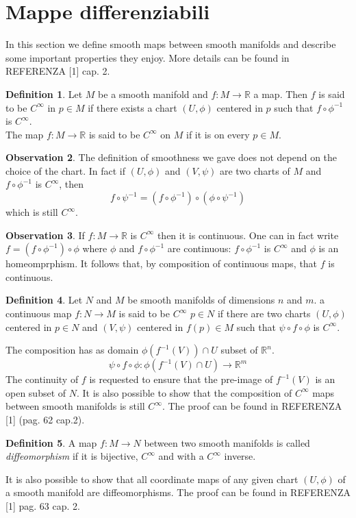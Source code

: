 \documentclass[12pt,a4paper]{report}
\theoremstyle{definition}
\newtheorem{Def}{Definition}[chapter]
\theoremstyle{Theorem}
\theoremstyle{definition}
\theoremstyle{definition}
\newtheorem{Obs}[Def]{Observation}
\begin{document}
		\section{Mappe differenziabili}
		In this section we define smooth maps between smooth manifolds and describe some important properties they enjoy. More details can be found in REFERENZA [1] cap. 2.
		\begin{Def}
			Let $M$ be a smooth manifold and $f:M\rightarrow\mathbb{R}$ a map. Then $f$ is said to be $C^\infty$ in $p\in M$ if there exists a chart $(U,\phi)$ centered in $p$ such that $f\circ \phi^{-1}$ is $C^\infty$.\\
			The map $f:M\rightarrow \mathbb{R}$ is said to be $C^\infty$ on $M$ if it is on every $p\in M$.
		\end{Def}
		\begin{Obs}
			The definition of smoothness we gave does not depend on the choice of the chart. In fact if $(U,\phi)$ and $(V,\psi)$ are two charts of $M$ and $f\circ\phi^{-1}$ is $C^\infty$, then $$f\circ\psi^{-1}=(f\circ\phi^{-1})\circ(\phi\circ\psi^{-1})$$ which is still $C^\infty$.
		\end{Obs}
		\begin{Obs}
			If $f:M\rightarrow \mathbb{R}$ is $C^\infty$ then it is continuous. One can in fact write $f=(f\circ\phi^{-1})\circ \phi$ where $\phi$ and $f\circ\phi^{-1}$ are continuous: $f\circ\phi^{-1}$ is $C^\infty$ and $\phi$ is an homeomprphism. It follows that, by composition of continuous maps, that $f$ is continuous.\\
		\end{Obs}
		\begin{Def}
			Let $N$ and $M$ be smooth manifolds of dimensions $n$ and $m$. a continuous map $f:N\rightarrow M$ is said to be $C^\infty$  $p\in N$ if there are two charts $(U,\phi)$ centered in $p\in N$ and $(V,\psi)$ centered in $f(p)\in M$ such that $\psi\circ f\circ \phi$ is $C^\infty$.
		\end{Def}
		The composition has as domain $\phi(f^{-1}(V))\cap U$ subset of $\mathbb{R}^n$. $$\psi\circ f\circ \phi:\phi(f^{-1}(V)\cap U)\rightarrow \mathbb{R}^m$$
		The continuity of $f$ is requested to ensure that the pre-image of $f^{-1}(V)$ is an open subset of $N$. It is also possible to show that the composition of $C^\infty$ maps between smooth manifolds is still $C^\infty$. The proof can be found in REFERENZA [1] (pag. 62 cap.2). 
		\begin{Def}
			A map $f:M\rightarrow N$ between two smooth manifolds is called \textit{diffeomorphism} if it is bijective, $C^\infty$ and with a $C^\infty$ inverse.
		\end{Def}
		It is also possible to show that all coordinate maps of any given chart $(U,\phi)$ of a smooth manifold are diffeomorphisms. The proof can be found in REFERENZA [1] pag. 63 cap. 2.
\end{document}

